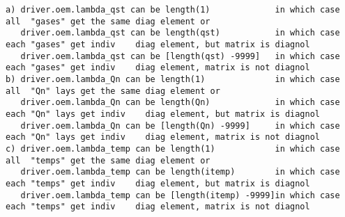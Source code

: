 \documentclass[11pt]{article}
\begin{document}
\begin{itemize}
\begin{small}
\begin{verbatim}
a) driver.oem.lambda_qst can be length(1)             in which case all  "gases" get the same diag element or
   driver.oem.lambda_qst can be length(qst)           in which case each "gases" get indiv    diag element, but matrix is diagnol
   driver.oem.lambda_qst can be [length(qst) -9999]   in which case each "gases" get indiv    diag element, matrix is not diagnol
b) driver.oem.lambda_Qn can be length(1)              in which case all  "Qn" lays get the same diag element or
   driver.oem.lambda_Qn can be length(Qn)             in which case each "Qn" lays get indiv    diag element, but matrix is diagnol
   driver.oem.lambda_Qn can be [length(Qn) -9999]     in which case each "Qn" lays get indiv    diag element, matrix is not diagnol
c) driver.oem.lambda_temp can be length(1)            in which case all  "temps" get the same diag element or
   driver.oem.lambda_temp can be length(itemp)        in which case each "temps" get indiv    diag element, but matrix is diagnol
   driver.oem.lambda_temp can be [length(itemp) -9999]in which case each "temps" get indiv    diag element, matrix is not diagnol
\end{verbatim}
\end{small}

\end{itemize}
\end{document}
